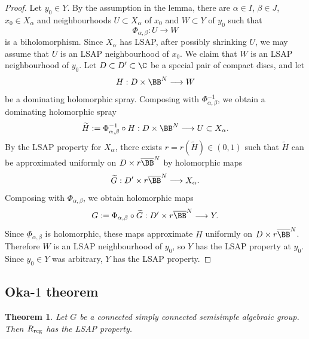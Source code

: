 \documentclass[12pt, a4paper, oneside]{amsart}
\theoremstyle{plain} %
\newtheorem{theorem}{Theorem}
\theoremstyle{definition} %
\theoremstyle{remark} %
\begin{document}
\begin{proof}
Let $y_0\in Y$. By the assumption in the lemma, there are $\alpha\in I$, $\beta\in J$, $x_0\in X_\alpha$ and neighbourhoods $U\subset X_\alpha$ of $x_0$ and $W\subset Y$ of $y_0$ such that 
\[\Phi_{\alpha,\beta}:U\longrightarrow W\] 
is a biholomorphism. Since \(X_\alpha\) has LSAP, after possibly shrinking \(U\), we may assume that \(U\) is an LSAP neighbourhood of \(x_0\). We claim that $W$ is an LSAP neighbourhood of $y_0$. Let
\(D\subset D'\subset \C\) be a special pair of compact discs, and let
\[
H:D\times \BB^N\longrightarrow W
\]
be a dominating holomorphic spray. Composing with \(\Phi_{\alpha,\beta}^{-1}\), we
obtain a dominating holomorphic spray
\[
\widetilde H:=\Phi_{\alpha,\beta}^{-1}\circ H:
D\times \BB^N\longrightarrow U\subset X_\alpha.
\]
By the LSAP property for $X_\alpha$, there exists $r=r(\widetilde H)\in(0,1)$
such that \(\widetilde H\) can be approximated uniformly on $D\times r\overline{\BB}^N$ by holomorphic maps
\[
\widetilde G:D'\times r\overline{\BB}^N\longrightarrow X_\alpha.
\]
Composing with \(\Phi_{\alpha,\beta}\), we obtain holomorphic maps
\[
G:=\Phi_{\alpha,\beta}\circ \widetilde G:
D'\times r\overline{\BB}^N\longrightarrow Y.
\]
Since $\Phi_{\alpha,\beta}$ is holomorphic, these maps approximate $H$ uniformly on $D\times r\overline{\BB}^N$. Therefore $W$ is an LSAP neighbourhood of $y_0$, so $Y$ has the LSAP property at $y_0$. Since $y_0\in Y$ was arbitrary, $Y$ has the LSAP property.
\end{proof}

\subsection{Oka-$1$ theorem}\label{c:Oka1theorem}

\begin{theorem}\label{thm:RregLSAP}
Let $G$ be a connected simply connected semisimple algebraic group. Then $R_{\rm reg}$ has the LSAP property.
\end{theorem}
\end{document}
